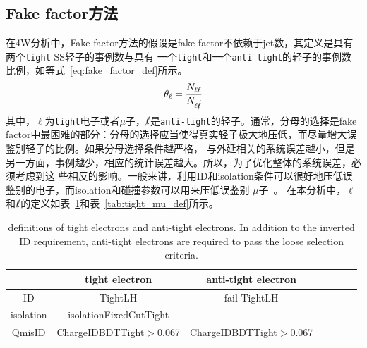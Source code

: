 \subsection{Fake factor方法}
在4W分析中，Fake factor方法的假设是fake factor不依赖于jet数，其定义是具有两个\texttt{tight} SS轻子的事例数与具有
一个\texttt{tight}和一个\texttt{anti-tight}的轻子的事例数比例，如等式~\ref{eq:fake_factor_def}所示。
\begin{equation}
\theta_{\ell}=\frac{N_{\ell \ell}}{N_{\ell \cancel{\ell}}}
\label{eq:fake_factor_def}
\end{equation}
其中，$\ell$为\texttt{tight}电子或者$\mu$子，$\cancel{\ell}$是\texttt{anti-tight}的轻子。通常，分母的选择是fake 
factor中最困难的部分：分母的选择应当使得真实轻子极大地压低，而尽量增大误鉴别轻子的比例。如果分母选择条件越严格，
与外延相关的系统误差越小，但是另一方面，事例越少，相应的统计误差越大。所以，为了优化整体的系统误差，必须考虑到这
些相反的影响。一般来讲，利用ID和isolation条件可以很好地压低误鉴别的电子，而isolation和碰撞参数可以用来压低误鉴别
$\mu$子~\cite{Alison2015}。
在本分析中，$\ell$和$\cancel{\ell}$的定义如表~\ref{tab:tight_ele_def}和表~\ref{tab:tight_mu_def}所示。
\begin{table}[!ht]
\begin{center}
\begin{tabular}{c|cccccc}
\hline
  &tight electron    &anti-tight electron  \\
\hline
ID  &TightLH  &fail TightLH \\
isolation &isolationFixedCutTight  &- \\
QmisID          &ChargeIDBDTTight$>$0.067  &ChargeIDBDTTight$>$0.067 \\
\hline
\end{tabular}
\caption{definitions of tight electrons and anti-tight electrons. In addition to the inverted ID requirement, anti-tight
electrons are required to pass the loose selection criteria.}
\label{tab:tight_ele_def}
\end{center}
\end{table}

